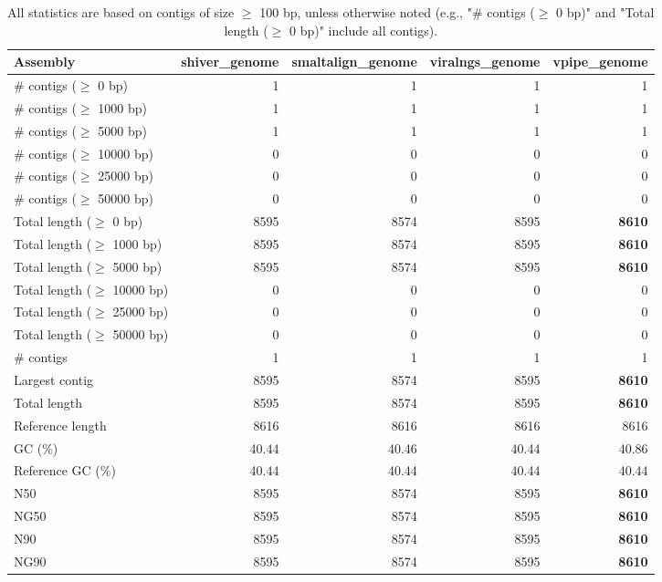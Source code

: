 \documentclass[12pt,a4paper]{article}
\begin{document}
\begin{table}[ht]
\begin{center}
\caption{All statistics are based on contigs of size $\geq$ 100 bp, unless otherwise noted (e.g., "\# contigs ($\geq$ 0 bp)" and "Total length ($\geq$ 0 bp)" include all contigs).}
\begin{tabular}{|l*{4}{|r}|}
\hline
Assembly & shiver\_genome & smaltalign\_genome & viralngs\_genome & vpipe\_genome \\ \hline
\# contigs ($\geq$ 0 bp) & 1 & 1 & 1 & 1 \\ \hline
\# contigs ($\geq$ 1000 bp) & 1 & 1 & 1 & 1 \\ \hline
\# contigs ($\geq$ 5000 bp) & 1 & 1 & 1 & 1 \\ \hline
\# contigs ($\geq$ 10000 bp) & 0 & 0 & 0 & 0 \\ \hline
\# contigs ($\geq$ 25000 bp) & 0 & 0 & 0 & 0 \\ \hline
\# contigs ($\geq$ 50000 bp) & 0 & 0 & 0 & 0 \\ \hline
Total length ($\geq$ 0 bp) & 8595 & 8574 & 8595 & {\bf 8610} \\ \hline
Total length ($\geq$ 1000 bp) & 8595 & 8574 & 8595 & {\bf 8610} \\ \hline
Total length ($\geq$ 5000 bp) & 8595 & 8574 & 8595 & {\bf 8610} \\ \hline
Total length ($\geq$ 10000 bp) & 0 & 0 & 0 & 0 \\ \hline
Total length ($\geq$ 25000 bp) & 0 & 0 & 0 & 0 \\ \hline
Total length ($\geq$ 50000 bp) & 0 & 0 & 0 & 0 \\ \hline
\# contigs & 1 & 1 & 1 & 1 \\ \hline
Largest contig & 8595 & 8574 & 8595 & {\bf 8610} \\ \hline
Total length & 8595 & 8574 & 8595 & {\bf 8610} \\ \hline
Reference length & 8616 & 8616 & 8616 & 8616 \\ \hline
GC (\%) & 40.44 & 40.46 & 40.44 & 40.86 \\ \hline
Reference GC (\%) & 40.44 & 40.44 & 40.44 & 40.44 \\ \hline
N50 & 8595 & 8574 & 8595 & {\bf 8610} \\ \hline
NG50 & 8595 & 8574 & 8595 & {\bf 8610} \\ \hline
N90 & 8595 & 8574 & 8595 & {\bf 8610} \\ \hline
NG90 & 8595 & 8574 & 8595 & {\bf 8610} \\ \hline

\end{tabular}
\end{center}
\end{table}
\end{document}
